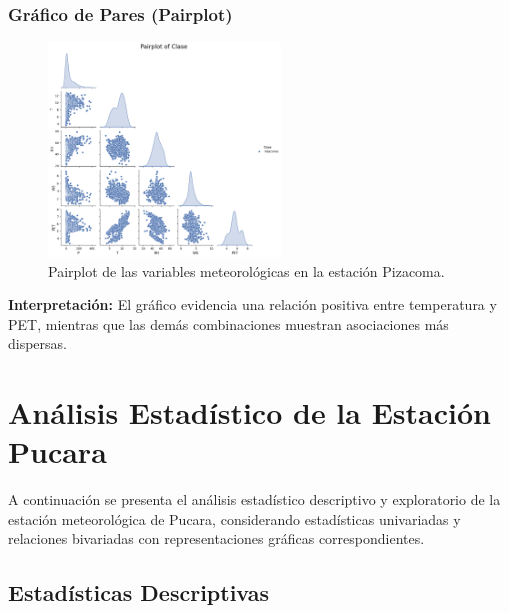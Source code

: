 \subsubsection*{Gráfico de Pares (Pairplot)}
\begin{figure}[H]
\centering
\includegraphics[width=0.55\textwidth]{resultados/por_estacion_meteorologica/Pizacoma/pairplot.png}
\caption{Pairplot de las variables meteorológicas en la estación Pizacoma.}
\label{fig:pizacoma_pairplot}
\end{figure}
\textbf{Interpretación:} El gráfico evidencia una relación positiva entre temperatura y PET, mientras que las demás combinaciones muestran asociaciones más dispersas.


\section{Análisis Estadístico de la Estación Pucara}

A continuación se presenta el análisis estadístico descriptivo y exploratorio de la estación meteorológica de Pucara, considerando estadísticas univariadas y relaciones bivariadas con representaciones gráficas correspondientes.

\subsection{Estadísticas Descriptivas}


